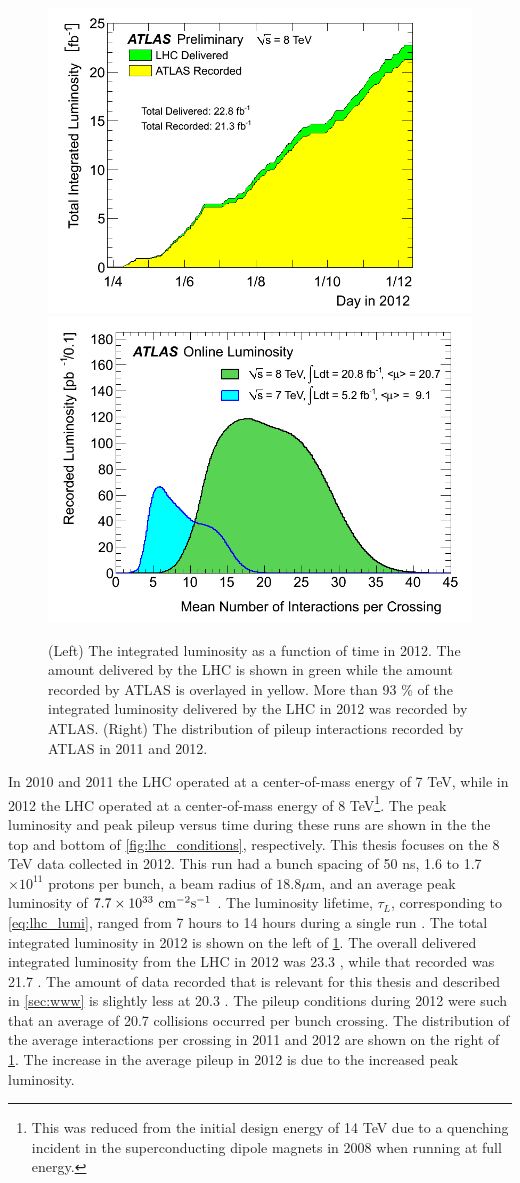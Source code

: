 \begin{figure}[ht]
\centering
\includegraphics[width=.495\textwidth]{figures/lhc/integratedlumi.png}
\includegraphics[width=.495\textwidth]{figures/lhc/pileup.png}
\caption{ (Left) The integrated luminosity as a function of time in 2012. The amount
delivered by the LHC is shown in green while the amount recorded by ATLAS
is overlayed in yellow. More than 93 \% of the integrated luminosity 
delivered by the LHC in 2012 was recorded by ATLAS.  
(Right) The distribution of pileup interactions recorded by ATLAS in 2011 and 2012.  }
\label{fig:lhc_lumi}
\end{figure}

In 2010 and 2011 the LHC operated at a center-of-mass energy of 7 TeV, while
in 2012 the LHC operated at a center-of-mass energy of 8 TeV\footnote{This
was reduced from the initial design energy of 14 TeV due to a quenching incident
in the superconducting dipole magnets in 2008 when running at full energy.}.
The peak luminosity and peak pileup versus time during these runs
are shown in the the top and bottom of \fig\ref{fig:lhc_conditions}, respectively.
This thesis focuses on the 8 TeV data collected in 2012.
This run had 
a bunch spacing of 50 ns, 1.6 to 1.7 $\times 10^{11}$ protons
per bunch, a beam radius of $18.8 \mu$m, and an average peak 
luminosity of $7.7 \times 10^{33}~\textrm{cm}^{-2}\textrm{s}^{-1}$ \cite{Lamont:1709796}.
The luminosity lifetime, $\tau_L$, corresponding to \eqn\eqref{eq:lhc_lumi},
ranged from 7 hours to 14 hours during a single run \cite{Hostettler:2013qya}.
The total integrated luminosity in 2012 is shown 
on the left of \fig\ref{fig:lhc_lumi}.
The overall delivered integrated luminosity from the LHC
in 2012 was 23.3 \ifb, while that recorded was 21.7 \ifb. The 
amount of data recorded that is relevant for this thesis
and described in \sec\ref{sec:www} is slightly less at 20.3 \ifb.
The pileup conditions during 2012 were such that an average
of 20.7 collisions occurred per bunch crossing. The distribution
of the average interactions per crossing in 2011 and 2012 are shown on
the right of \fig\ref{fig:lhc_lumi}. The increase in the average pileup 
in 2012 is due to the increased peak luminosity.





